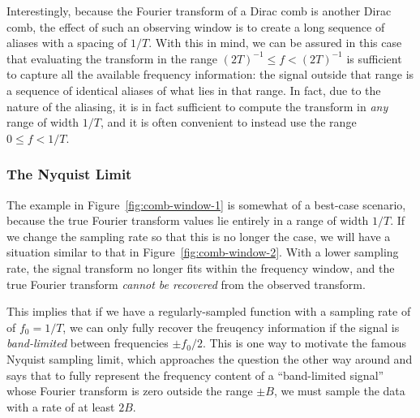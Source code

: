 \documentclass[preprint]{aastex}
\newcommand{\fig}[1]{Figure~\ref{fig:#1}}
\newcommand{\sectlabel}[1]{\label{sect:#1}}
\begin{document}
Interestingly, because the Fourier transform of a Dirac comb is another Dirac
comb, the effect of such an observing window is to create a long sequence
of aliases with a spacing of $1/T$.
With this in mind, we can be assured in this case that evaluating the
transform in the range $(2T)^{-1} \le f < (2T)^{-1}$ is sufficient to capture
all the available frequency information:
the signal outside that range is a sequence of identical aliases of
what lies in that range.
In fact, due to the nature of the aliasing, it is in fact sufficient to
compute the transform in {\it any} range of width $1/T$, and it is often
convenient to instead use the range $0 \le f < 1/T$.

\subsubsection{The Nyquist Limit}
\sectlabel{nyquist}

The example in \fig{comb-window-1} is somewhat of a best-case scenario, because
the true Fourier transform values lie entirely in a range of width $1/T$.
If we change the sampling rate so that this is no longer the case, we will
have a situation similar to that in \fig{comb-window-2}.
With a lower sampling rate, the signal transform no longer fits within the
frequency window, and the true Fourier transform {\it cannot be recovered}
from the observed transform.

This implies that if we have a regularly-sampled function with a sampling
rate of of $f_0 = 1/T$, we can only fully recover the freuqency information
if the signal is {\it band-limited} between frequencies $\pm f_0/2$.
This is one way to motivate the famous Nyquist sampling limit, which
approaches the question the other way around and says
that to fully represent the frequency content of a ``band-limited signal''
whose Fourier transform is zero outside the range $\pm B$,
we must sample the data with a rate of at least $2B$.
\end{document}
